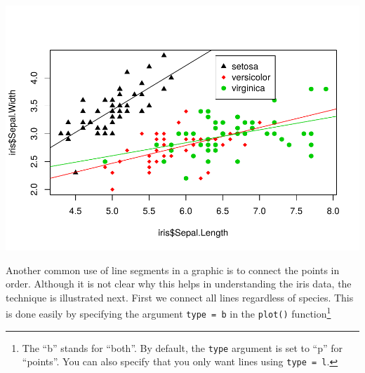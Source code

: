 \documentclass[
]{krantz}
\makeatletter
\newenvironment{Shaded}{\begin{snugshade}}{\end{snugshade}}
\newcommand{\DataTypeTok}[1]{\textcolor[rgb]{0.27,0.27,0.27}{#1}}
\newcommand{\DecValTok}[1]{\textcolor[rgb]{0.06,0.06,0.06}{#1}}
\newcommand{\FloatTok}[1]{\textcolor[rgb]{0.06,0.06,0.06}{#1}}
\newcommand{\KeywordTok}[1]{\textcolor[rgb]{0.27,0.27,0.27}{\textbf{#1}}}
\newcommand{\NormalTok}[1]{#1}
\newcommand{\OperatorTok}[1]{\textcolor[rgb]{0.43,0.43,0.43}{\textbf{#1}}}
\newcommand{\StringTok}[1]{\textcolor[rgb]{0.5,0.5,0.5}{#1}}
\newenvironment{kframe}{%
\medskip{}
\setlength{\fboxsep}{.8em}
 \def\at@end@of@kframe{}%
 \ifinner\ifhmode%
  \def\at@end@of@kframe{\end{minipage}}%
  \begin{minipage}{\columnwidth}%
 \fi\fi%
 \def\FrameCommand##1{\hskip\@totalleftmargin \hskip-\fboxsep
 \colorbox{shadecolor}{##1}\hskip-\fboxsep
     \hskip-\linewidth \hskip-\@totalleftmargin \hskip\columnwidth}%
 \MakeFramed {\advance\hsize-\width
   \@totalleftmargin\z@ \linewidth\hsize
   \@setminipage}}%
 {\par\unskip\endMakeFramed%
 \at@end@of@kframe}
\renewenvironment{Shaded}{\begin{kframe}}{\end{kframe}}
\makeatother
\begin{document}
\includegraphics{bookdown_files/figure-latex/unnamed-chunk-340-1.pdf}

Another common use of line segments in a graphic is to connect the points in order. Although it is not clear why this helps in understanding the iris data, the technique is illustrated next. First we connect all lines regardless of species. This is done easily by specifying the argument \texttt{type\ =\ \textquotesingle{}b\textquotesingle{}} in the \texttt{plot()} function\footnote{The ``b'' stands for ``both''. By default, the \texttt{type} argument is set to ``p'' for ``points''. You can also specify that you only want lines using \texttt{type\ =\ \textquotesingle{}l\textquotesingle{}}.}

\begin{Shaded}
\end{Shaded}
\end{document}
